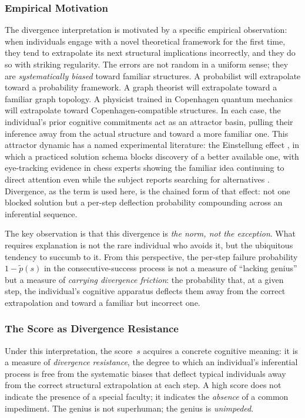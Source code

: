 \documentclass{article}
\begin{document}
\subsubsection{Empirical Motivation}

The divergence interpretation is motivated by a specific empirical observation: when individuals engage with a novel theoretical framework for the first time, they tend to extrapolate its next structural implications incorrectly, and they do so with striking regularity. The errors are not random in a uniform sense; they are \emph{systematically biased} toward familiar structures. A probabilist will extrapolate toward a probability framework. A graph theorist will extrapolate toward a familiar graph topology. A physicist trained in Copenhagen quantum mechanics will extrapolate toward Copenhagen-compatible structures. In each case, the individual's prior cognitive commitments act as an attractor basin, pulling their inference away from the actual structure and toward a more familiar one. This attractor dynamic has a named experimental literature: the Einstellung effect \cite{luchins1942}, in which a practiced solution schema blocks discovery of a better available one, with eye-tracking evidence in chess experts showing the familiar idea continuing to direct attention even while the subject reports searching for alternatives \cite{bilalic2008}. Divergence, as the term is used here, is the chained form of that effect: not one blocked solution but a per-step deflection probability compounding across an inferential sequence.

The key observation is that this divergence is \emph{the norm, not the exception}. What requires explanation is not the rare individual who avoids it, but the ubiquitous tendency to succumb to it. From this perspective, the per-step failure probability $1 - \widetilde{p}(s)$ in the consecutive-success process is not a measure of ``lacking genius'' but a measure of \emph{carrying divergence friction}: the probability that, at a given step, the individual's cognitive apparatus deflects them away from the correct extrapolation and toward a familiar but incorrect one.

\subsubsection{The Score as Divergence Resistance}

Under this interpretation, the score~$s$ acquires a concrete cognitive meaning: it is a measure of \emph{divergence resistance}, the degree to which an individual's inferential process is free from the systematic biases that deflect typical individuals away from the correct structural extrapolation at each step. A high score does not indicate the presence of a special faculty; it indicates the \emph{absence} of a common impediment. The genius is not superhuman; the genius is \emph{unimpeded}.
\end{document}

